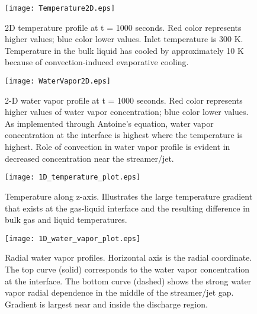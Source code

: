 \begin{figure}[htb]
    \centering
        \texttt{[image: Temperature2D.eps]}
        \caption{2D temperature profile at t = 1000 seconds. Red color represents higher values; blue color lower values. Inlet temperature is 300 K. Temperature in the bulk liquid has cooled by approximately 10 K because of convection-induced evaporative cooling.}
        \label{fig:temp_2D_profile}
\end{figure}

\begin{figure}[htb]
    \centering
        \texttt{[image: WaterVapor2D.eps]}
        \caption{2-D water vapor profile at t = 1000 seconds. Red color represents higher values of water vapor concentration; blue color lower values. As implemented through Antoine's equation, water vapor concentration at the interface is highest where the temperature is highest. Role of convection in water vapor profile is evident in decreased concentration near the streamer/jet.}
        \label{fig:water_2D_profile}
\end{figure}

\begin{figure}[htb]
    \centering
        \texttt{[image: 1D\_temperature\_plot.eps]}
        \caption{Temperature along z-axis. Illustrates the large temperature gradient that exists at the gas-liquid interface and the resulting difference in bulk gas and liquid temperatures.}
        \label{fig:temp_1D_profile}
\end{figure}

\begin{figure}[htb]
    \centering
        \texttt{[image: 1D\_water\_vapor\_plot.eps]}
        \caption{Radial water vapor profiles. Horizontal axis is the radial coordinate. The top curve (solid) corresponds to the water vapor concentration at the interface. The bottom curve (dashed) shows the strong water vapor radial dependence in the middle of the streamer/jet gap. Gradient is largest near and inside the discharge region.}
        \label{fig:water_1D_profile}
\end{figure}

